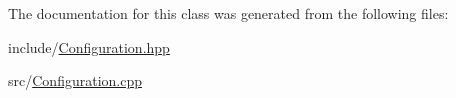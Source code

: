 The documentation for this class was generated from the following files:\begin{DoxyCompactItemize}
\item 
include/\hyperlink{Configuration_8hpp}{Configuration.hpp}\item 
src/\hyperlink{Configuration_8cpp}{Configuration.cpp}\end{DoxyCompactItemize}
